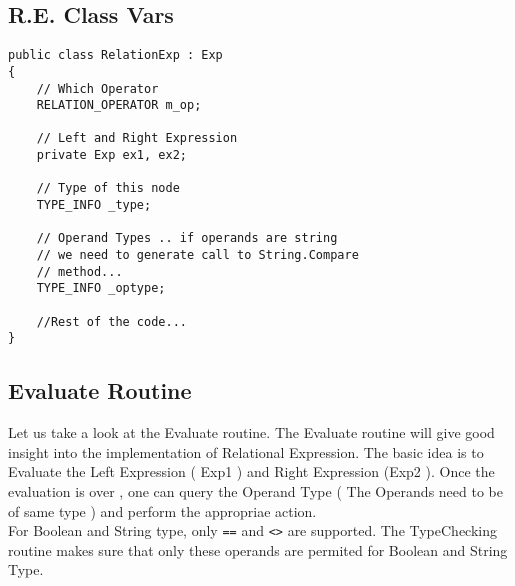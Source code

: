 \subsection{R.E. Class Vars}
\lstset{style=csharp}
\begin{lstlisting}
public class RelationExp : Exp
{
	// Which Operator
	RELATION_OPERATOR m_op;
	
	// Left and Right Expression
	private Exp ex1, ex2;
	
	// Type of this node
	TYPE_INFO _type;

	// Operand Types .. if operands are string
	// we need to generate call to String.Compare
	// method...
	TYPE_INFO _optype;
	
	//Rest of the code...
}
\end{lstlisting}
\subsection{Evaluate Routine}
Let us take a look at the Evaluate routine. The Evaluate routine will give good insight into the implementation of Relational Expression. The basic idea is to Evaluate the Left Expression ( Exp1 ) and Right Expression (Exp2 ). Once the evaluation is over , one can query the Operand Type ( The Operands need to be of same type ) and perform the appropriae action.\\

For Boolean and String type, only \texttt{==} and \texttt{<>} are supported. The TypeChecking routine makes sure that only these operands are permited for Boolean and String Type.


